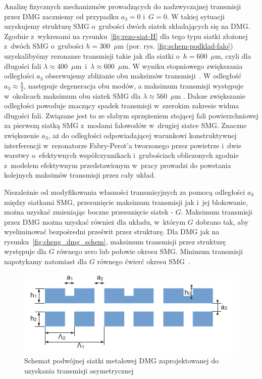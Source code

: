 Analizę fizycznych mechanizmów prowadzących do nadzwyczajnej transmisji przez DMG zaczniemy od przypadku $a_3=0$ i~$G=0$. W takiej sytuacji uzyskujemy strukturę SMG o~grubości dwóch siatek składających się na DMG. Zgodnie z~wykresami na rysunku~\ref{fig:rezo-siat-H} dla tego typu siatki złożonej z~dwóch SMG o~grubości $h=300$~$\mu$m (por. rys. \ref{fig:schem-podklad-falo}) uzyskalibyśmy rezonanse transmisji takie jak dla siatki o~$h=600$~$\mu$m, czyli dla długości fali $\lambda \approx 400$~$\mu$m~i~$\lambda \approx 600$~$\mu$m. W wyniku stopniowego zwiększania odległości $a_3$ obserwujemy zbliżanie obu maksimów transmisji~\cite{cheng2008physical}. W odległość $a_3 \approx \frac{h}{2}$, następuje degeneracja obu modów, a maksimum transmisji występuje w~okolicach maksimum obu siatek SMG dla $\lambda \approx 560$~$\mu$m \cite{cheng2008physical}. Dalsze zwiększanie odległości powoduje znaczący spadek transmisji w~szerokim zakresie widma długości fali. Związane jest to ze słabym sprzężeniem stojącej fali powierzchniowej za pierwszą siatką SMG z~modami falowodów w~drugiej siatce SMG. Znaczne zwiększenie $a_3$, aż do odległości odpowiadającej warunkowi konstruktywnej interferencji w~rezonatorze Fabry-Perot'a tworzonego przez powietrze i~dwie warstwy o~efektywnych współczynnikach i~grubościach obliczonych zgodnie z~modelem efektywnym przedstawionym w~pracy \cite{shen2005mechanism} prowadzi do powstania kolejnych maksimów transmisji przez cały układ.

Niezależnie od modyfikowania własności transmisyjnych za pomocą odległości $a_3$ między siatkami SMG, przesunięcie maksimum transmisji jak i~jej blokowanie, można uzyskać zmieniając boczne przesunięcie siatek - $G$. Maksimum transmisji przez DMG można uzyskać również dla układu, w~którym $G$ dobrano tak, aby wyeliminować bezpośredni prześwit przez strukturę. Dla DMG jak na rysunku~\ref{fig:cheng_dmg_schem}, maksimum transmisji przez strukturę występuje dla $G$ równego zero lub połowie okresu SMG. Minimum transmisji napotykamy natomiast dla $G$ równego ćwierć okresu SMG~\cite{chan2006optical}.

\begin{figure}[tb]
	\includegraphics[width=\textwidth]{images/thz/1D-DMG-schemat.png}
	\caption{Schemat podwójnej siatki metalowej DMG zaprojektowanej do uzyskania transmisji asymetrycznej}
	\label{fig:1ddmg-schem}
\end{figure}


